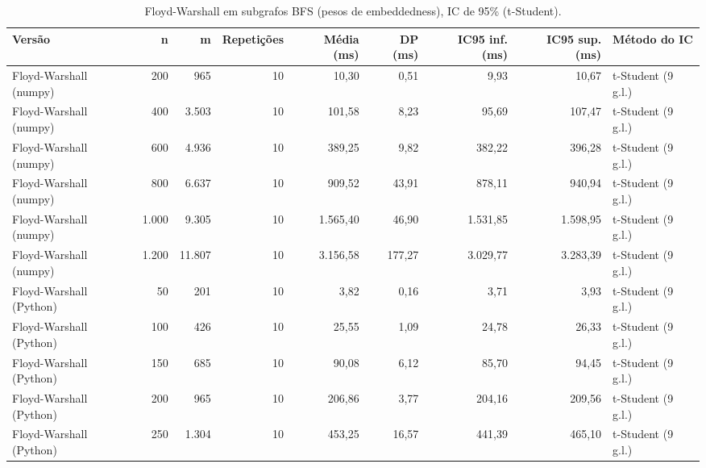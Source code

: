 \begin{table}[ht]
\centering
\caption{Floyd-Warshall em subgrafos BFS (pesos de embeddedness), IC de 95\% (t-Student).}
\label{tab:floyd}
\small
\begin{tabular}{lrrrrrrrl}
\hline
Versão & n & m & Repetições & Média (ms) & DP (ms) & IC95 inf. (ms) & IC95 sup. (ms) & Método do IC \\
\hline
Floyd-Warshall (numpy) & 200 & 965 & 10 & 10,30 & 0,51 & 9,93 & 10,67 & t-Student (9 g.l.) \\
Floyd-Warshall (numpy) & 400 & 3.503 & 10 & 101,58 & 8,23 & 95,69 & 107,47 & t-Student (9 g.l.) \\
Floyd-Warshall (numpy) & 600 & 4.936 & 10 & 389,25 & 9,82 & 382,22 & 396,28 & t-Student (9 g.l.) \\
Floyd-Warshall (numpy) & 800 & 6.637 & 10 & 909,52 & 43,91 & 878,11 & 940,94 & t-Student (9 g.l.) \\
Floyd-Warshall (numpy) & 1.000 & 9.305 & 10 & 1.565,40 & 46,90 & 1.531,85 & 1.598,95 & t-Student (9 g.l.) \\
Floyd-Warshall (numpy) & 1.200 & 11.807 & 10 & 3.156,58 & 177,27 & 3.029,77 & 3.283,39 & t-Student (9 g.l.) \\
Floyd-Warshall (Python) & 50 & 201 & 10 & 3,82 & 0,16 & 3,71 & 3,93 & t-Student (9 g.l.) \\
Floyd-Warshall (Python) & 100 & 426 & 10 & 25,55 & 1,09 & 24,78 & 26,33 & t-Student (9 g.l.) \\
Floyd-Warshall (Python) & 150 & 685 & 10 & 90,08 & 6,12 & 85,70 & 94,45 & t-Student (9 g.l.) \\
Floyd-Warshall (Python) & 200 & 965 & 10 & 206,86 & 3,77 & 204,16 & 209,56 & t-Student (9 g.l.) \\
Floyd-Warshall (Python) & 250 & 1.304 & 10 & 453,25 & 16,57 & 441,39 & 465,10 & t-Student (9 g.l.) \\
\hline
\end{tabular}
\end{table}

